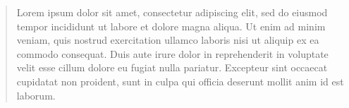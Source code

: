 \documentclass[12pt,a4paper]{report}
\begin{document}
\thispagestyle{empty}
\vspace*{5cm}
\renewcommand{\abstractname}{\color{MyDarkBlue}{Abstract}} 
\begin{abstract}
Lorem ipsum dolor sit amet, consectetur adipiscing elit, sed do eiusmod tempor incididunt ut labore et dolore magna aliqua. Ut enim ad minim veniam, quis nostrud exercitation ullamco laboris nisi ut aliquip ex ea commodo consequat. Duis aute irure dolor in reprehenderit in voluptate velit esse cillum dolore eu fugiat nulla pariatur. Excepteur sint occaecat cupidatat non proident, sunt in culpa qui officia deserunt mollit anim id est laborum.
\end{abstract}
\setcounter{page}{1}
\tableofcontents{}









\nocite{*}


\end{document}
